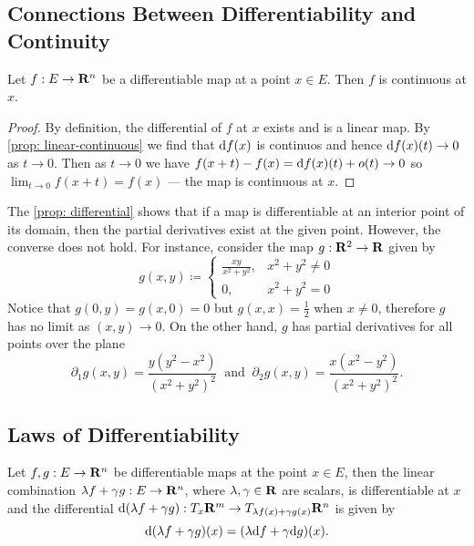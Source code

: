 \subsection{Connections Between Differentiability and Continuity}

\begin{corollary}
  Let \(f: E \to \mathbf{R}^n\) be a differentiable map at a point \(x \in E\).
  Then \(f\) is continuous at \(x\).
\end{corollary}

\begin{proof}
  By definition, the differential of \(f\) at \(x\) exists and is a linear map.
  By \cref{prop: linear-continuous} we find that \(\mathrm{d} f(x)\) is continuos and
  hence \(\mathrm{d} f(x)(t) \to 0\) as \(t \to 0\). Then as \(t \to 0\) we have
  \(f(x + t) - f(x) = \mathrm{d} f(x)(t) + o(t) \to 0\) so \(\lim_{t \to 0} f(x + t)
  = f(x)\) --- the map is continuous at \(x\).
\end{proof}

\begin{remark}
  The \cref{prop: differential} shows that if a map is differentiable at an
  interior point of its domain, then the partial derivatives exist at the given
  point. However, the converse does not hold. For instance, consider the map
  \(g: \mathbf{R}^2 \to \mathbf{R}\) given by
  \[
    g(x, y) \coloneq
    \begin{cases}
      \frac{x y}{x^2 + y^2}, &x^2 + y^2 \neq 0 \\
      0, &x^2 + y^2 = 0
    \end{cases}
  \]
  Notice that \(g(0, y) = g(x, 0) = 0\) but \(g(x, x) = \frac 1 2\) when \(x
  \neq 0\), therefore \(g\) has no limit as \((x,y) \to 0\). On the other hand,
  \(g\) has partial derivatives for all points over the plane
  \[
    \partial_1 g(x, y) = \frac{y (y^2 - x^2)}{(x^2 + y^2)^2}
    \ \text{ and }\
    \partial_2 g(x, y) = \frac{x (x^2 - y^2)}{(x^2 + y^2)^2}.
  \]
\end{remark}

\subsection{Laws of Differentiability}

\begin{theorem}\label{thm: diff-linear}
  Let \(f, g: E \to \mathbf{R}^n\) be differentiable maps at the point \(x \in E\), then
  the linear combination \(\lambda f + \gamma g: E \to \mathbf{R}^n\), where \(\lambda,
  \gamma \in \mathbf{R}\) are scalars, is differentiable at \(x\) and the differential
  \(\mathrm{d}(\lambda f + \gamma g): T_x\mathbf{R}^m \to T_{\lambda f(x) + \gamma
  g(x)}\mathbf{R}^n\) is given by
  \[
    \mathrm{d} (\lambda f + \gamma g)(x) = (\lambda \mathrm{d} f + \gamma \mathrm{d} g)(x).
  \]
\end{theorem}

